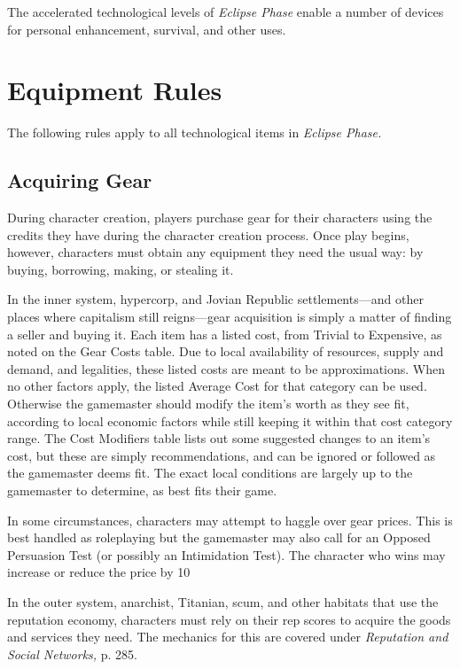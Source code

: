 The accelerated technological levels of \textit{Eclipse Phase}
enable a number of devices for personal enhancement, 
survival, and other uses.

\section{Equipment Rules}

The following rules apply to all technological items in 
\textit{Eclipse Phase.}

\subsection{Acquiring Gear}

During character creation, players purchase gear for 
their characters using the credits they have during 
the character creation process. Once play begins, 
however, characters must obtain any equipment they 
need the usual way: by buying, borrowing, making, 
or stealing it.

In the inner system, hypercorp, and Jovian Republic 
settlements—and other places where capitalism still 
reigns—gear acquisition is simply a matter of finding 
a seller and buying it. Each item has a listed cost, from 
Trivial to Expensive, as noted on the Gear Costs table. 
Due to local availability of resources, supply and 
demand, and legalities, these listed costs are meant 
to be approximations. When no other factors apply, 
the listed Average Cost for that category can be used. 
Otherwise the gamemaster should modify the item's 
worth as they see fit, according to local economic factors
while still keeping it within that cost category
range. The Cost Modifiers table lists out some suggested
changes to an item's cost, but these are simply
recommendations, and can be ignored or followed as 
the gamemaster deems fit. The exact local conditions 
are largely up to the gamemaster to determine, as best 
fits their game.

In some circumstances, characters may attempt to 
haggle over gear prices. This is best handled as roleplaying
but the gamemaster may also call for an
Opposed Persuasion Test (or possibly an Intimidation 
Test). The character who wins may increase or reduce 
the price by 10%

In the outer system, anarchist, Titanian, scum, and 
other habitats that use the reputation economy, characters
must rely on their rep scores to acquire the goods
and services they need. The mechanics for this are covered
under \textit{Reputation and Social Networks,} p. 285.

